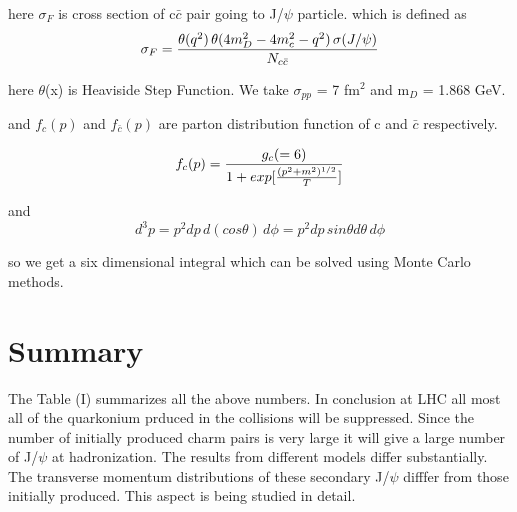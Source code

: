 \documentclass[aps,prc,preprint,superscriptaddress,showpacs,showkeys]{revtex4-1}
\begin{document}
here $\sigma_{F}$ is cross section of c$\bar{c}$ pair going to J/$\psi$ particle.
which is defined as
 \begin{equation}
\sigma_{F} ={ \theta(q^{2})\,\theta(4m_{D}^{2}-4m_{c}^{2}-q^{2})\,\sigma(J/\psi) \over N_{c\bar{c}} }
\end{equation}

here $\theta$(x) is Heaviside Step Function. We take $\sigma_{pp}$ = 7 fm$^{2}$ and
m$_D$ = 1.868 GeV.

and $f_{c}(p)$ and $f_{\bar{c}}(p)$ are parton distribution function of c and $\bar{c}$ respectively.

\begin{equation}
f_{c}(p)={g_c(=6)  \over 1+exp [ { (p^{2} + m^{2} )^{1/2}  \over T }] }
\end{equation}


and 
\begin{equation}
d^{3}p=p^{2} dp \, d(cos\theta)\,d\phi
=p^{2}dp\,sin\theta d\theta\,d\phi
\end{equation}


so we get a six dimensional integral which can be solved using Monte Carlo  methods. 




\section{Summary}
  The Table (I) summarizes all the above numbers. In conclusion at LHC all most all of the 
quarkonium prduced in the collisions will be suppressed. Since the number of initially 
produced charm pairs is very large it will give a large number of J/$\psi$ at hadronization.
The results from different models differ substantially. The 
transverse momentum distributions of these secondary  J/$\psi$ difffer from those 
initially produced. This aspect is being studied in detail. 
\end{document}
